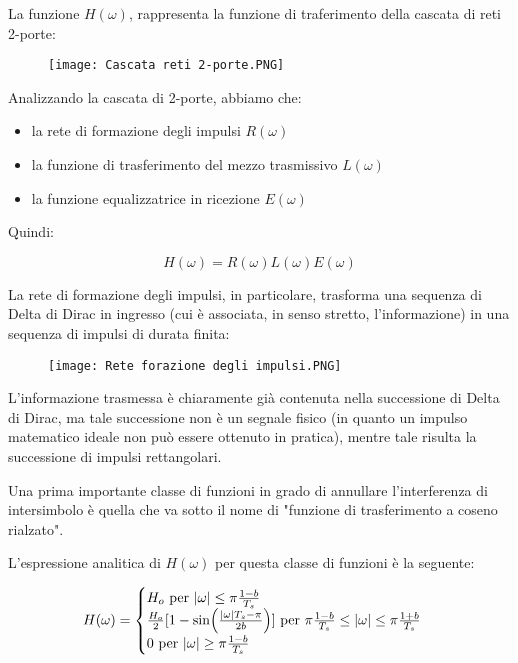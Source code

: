 La funzione $H(\omega)$, rappresenta la funzione di traferimento della cascata di reti 2-porte: 

\begin{figure}[h]
    \centering
    \texttt{[image: Cascata reti 2-porte.PNG]}
\end{figure} 

Analizzando la cascata di 2-porte, abbiamo che: 
\begin{itemize}
    \item la rete di formazione degli impulsi $R(\omega)$ 
    \item la funzione di trasferimento del mezzo trasmissivo $L(\omega)$ 
    \item la funzione equalizzatrice in ricezione $E(\omega)$
\end{itemize}

Quindi: 

{
    \Large 
    \begin{equation}
        H(\omega) = R(\omega)L(\omega)E(\omega)
    \end{equation}
}

La rete di formazione degli impulsi, in particolare, trasforma una sequenza di Delta di Dirac in ingresso (cui è associata, in senso stretto, l'informazione) 
in una sequenza di impulsi di durata finita: 

\begin{figure}[h]
    \centering
    \texttt{[image: Rete forazione degli impulsi.PNG]}
\end{figure} 

\newpage 

L'informazione trasmessa è chiaramente già contenuta nella successione di Delta di Dirac, ma tale successione non è un segnale fisico (in quanto un impulso matematico ideale non può essere ottenuto in pratica), 
mentre tale risulta la successione di impulsi rettangolari. \newline 

Una prima importante classe di funzioni in grado di annullare l'interferenza di intersimbolo è quella che va sotto il nome di "funzione di trasferimento a coseno rialzato". \newline 

L'espressione analitica di $H(\omega)$ per questa classe di funzioni è la seguente: 

{
    \Large 
    \begin{equation}
        H(\omega) 
        = 
        \begin{cases}
            H_o \text{ per } \abs{\omega} \leq \pi \frac{1 - b}{T_s} \\ 
            \frac{H_o}{2}[1 - \sin(\frac{\abs{\omega} T_s - \pi}{2b})] \text{ per } \pi \frac{1 - b}{T_s} \leq \abs{\omega} \leq \pi \frac{1 + b}{T_s} \\ 
            0 \text{ per } \abs{\omega} \geq \pi \frac{1 - b}{T_s}
        \end{cases}
    \end{equation}
}

